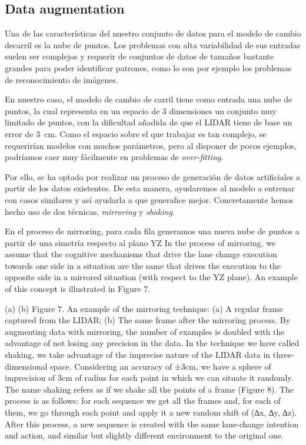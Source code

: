 \subsection{Data augmentation}

Una de las características del nuestro conjunto de datos para el modelo de cambio decarril es la nube de puntos. Los problemas con alta variabilidad de sus entradas suelen ser complejos y requerir de conjuntos de datos de tamaños bastante grandes para poder identificar patrones, como lo son por ejemplo los problemas de reconocimiento de imágenes.

En nuestro caso, el modelo de cambio de carril tiene como entrada una nube de puntos, la cual representa en un espacio de 3 dimensiones un conjunto muy limitado de puntos, con la dificultad añadida de que el LIDAR tiene de base un error de \SI{3}{\cm}. Como el espacio sobre el que trabajar es tan complejo, se requerirían modelos con muchos parámetros, pero al disponer de pocos ejemplos, podríamos caer muy fácilmente en problemas de \textit{over-fitting}.

Por ello, se ha optado por realizar un proceso de generación de datos artificiales a partir de los datos existentes. De esta manera, ayudaremos al modelo a entrenar con casos similares y así ayudarla a que generalice mejor. Concretamente hemos hecho uso de dos técnicas, \textit{mirroring} y \textit{shaking}.

En el proceso de mirroring, para cada fila generamos una nueva nube de puntos a partir de una simetría respecto al plano YZ
In the process of mirroring, we assume that the cognitive mechanisms that drive the lane change execution towards one side in a situation are the same that drives the execution to the opposite side in a mirrored situation (with respect to the YZ plane). An example of this concept is illustrated in Figure 7.


(a)
(b)
Figure 7. An example of the mirroring technique: (a) A regular frame captured from the LIDAR; (b) The same frame after the mirroring process.
By augmenting data with mirroring, the number of examples is doubled with the advantage of not losing any precision in the data.
In the technique we have called shaking, we take advantage of the imprecise nature of the LIDAR data in three-dimensional space. Considering an accuracy of ±3cm, we have a sphere of imprecision of 3cm of radius for each point in which we can situate it randomly. The name shaking refers as if we shake all the points of a frame (Figure 8).
The process is as follows: for each sequence we get all the frames and, for each of them, we go through each point and apply it a new random shift of (∆x, ∆y, ∆z). After this process, a new sequence is created with the same lane-change intention and action, and similar but slightly different environment to the original one.



